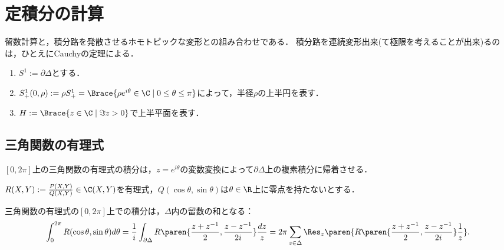 \documentclass[uplatex, dvipdfmx]{jsreport}
\begin{document}
\section{定積分の計算}

\begin{tcolorbox}[colframe=ForestGreen, colback=ForestGreen!10!white,breakable,colbacktitle=ForestGreen!40!white,coltitle=black,fonttitle=\bfseries\sffamily,
title=]
    留数計算と，積分路を発散させるホモトピックな変形との組み合わせである．
    積分路を連続変形出来(て極限を考えることが出来)るのは，ひとえにCauchyの定理による．
\end{tcolorbox}

\begin{notation}\mbox{}
    \begin{enumerate}
        \item $S^1:=\partial\Delta$とする．
        \item $S^1_+(0,\rho):=\rho S^1_+=\Brace{\rho e^{i\theta}\in\C\mid 0\le\theta\le\pi}$によって，半径$\rho$の上半円を表す．
        \item $H:=\Brace{z\in\C\mid\Im z>0}$で上半平面を表す．
    \end{enumerate}
\end{notation}

\subsection{三角関数の有理式}

\begin{tcolorbox}[colframe=ForestGreen, colback=ForestGreen!10!white,breakable,colbacktitle=ForestGreen!40!white,coltitle=black,fonttitle=\bfseries\sffamily,
title=]
    $[0,2\pi]$上の三角関数の有理式の積分は，$z=e^{i\theta}$の変数変換によって$\partial\Delta$上の複素積分に帰着させる．
\end{tcolorbox}

\begin{notation}
    $R(X,Y):=\frac{P(X,Y)}{Q(X,Y)}\in\C(X,Y)$を有理式，$Q(\cos\theta,\sin\theta)$は$\theta\in\R$上に零点を持たないとする．
\end{notation}

\begin{proposition}
    三角関数の有理式の$[0,2\pi]$上での積分は，$\Delta$内の留数の和となる：
    \[\int^{2\pi}_0R(\cos\theta,\sin\theta)d\theta=\frac{1}{i}\int_{\partial\Delta}R\paren{\frac{z+z^{-1}}{2},\frac{z-z^{-1}}{2i}}\frac{dz}{z}=2\pi\sum_{z\in\Delta}\Res_z\paren{R\paren{\frac{z+z^{-1}}{2},\frac{z-z^{-1}}{2i}}\frac{1}{z}}.\]
\end{proposition}
\end{document}
